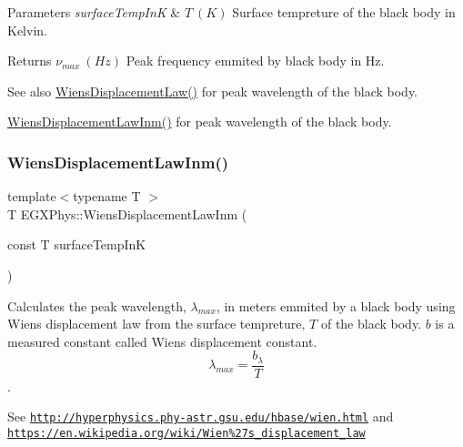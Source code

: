 \begin{DoxyParams}{Parameters}
{\em surface\+Temp\+InK} & $T\ (K)$ Surface tempreture of the black body in Kelvin. \\
\hline
\end{DoxyParams}
\begin{DoxyReturn}{Returns}
$\nu_{max}\ (Hz)$ Peak frequency emmited by black body in Hz. 
\end{DoxyReturn}
\begin{DoxySeeAlso}{See also}
\mbox{\hyperlink{group___e_g_x_phys-_electrodynamics-_black_body-_wiens_displacement_law_ga8f89ce1baac45a1717f604255d04af44}{Wiens\+Displacement\+Law()}} for peak wavelength of the black body. 

\mbox{\hyperlink{group___e_g_x_phys-_electrodynamics-_black_body-_wiens_displacement_law_ga126ebb146c31a2371f1d1d001d11c62f}{Wiens\+Displacement\+Law\+Inm()}} for peak wavelength of the black body. 
\end{DoxySeeAlso}
\mbox{\label{group___e_g_x_phys-_electrodynamics-_black_body-_wiens_displacement_law_ga126ebb146c31a2371f1d1d001d11c62f}} 
\subsubsection{\texorpdfstring{Wiens\+Displacement\+Law\+Inm()}{WiensDisplacementLawInm()}}
{\footnotesize\ttfamily template$<$typename T $>$ \\
T E\+G\+X\+Phys\+::\+Wiens\+Displacement\+Law\+Inm (\begin{DoxyParamCaption}\item[{const T}]{surface\+Temp\+InK }\end{DoxyParamCaption})}



Calculates the peak wavelength, $\lambda_{max}$, in meters emmited by a black body using Wien\textquotesingle{}s displacement law from the surface tempreture, $T$ of the black body. $b$ is a measured constant called Wien\textquotesingle{}s displacement constant. \[\lambda_{max} = \dfrac{b_\lambda}{T} \]. 

See \href{http://hyperphysics.phy-astr.gsu.edu/hbase/wien.html}{\tt http\+://hyperphysics.\+phy-\/astr.\+gsu.\+edu/hbase/wien.\+html} and \href{https://en.wikipedia.org/wiki/Wien%27s_displacement_law}{\tt https\+://en.\+wikipedia.\+org/wiki/\+Wien\%27s\+\_\+displacement\+\_\+law}


